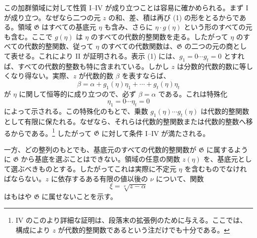 \documentclass[11pt]{article}
\begin{document}
この加群領域に対して性質 I--IV が成り立つことは容易に確かめられる。まず I が成り立つ。なぜなら二つの元 $z$ の和、差、積は再び (1) の形をとるからである。領域 $\mathfrak G$ はすべての基底元 $\eta$ も含み、さらに $\eta\cdot g(\eta)$ という形のすべての元も含む。ここで $g(\eta)$ は $\eta$ のすべての代数的整関数を走る。したがって $\eta$ のすべての代数的整関数、従って $\eta$ のすべての代数関数は、$\mathfrak G$ の二つの元の商として表せる。これにより II が証明される。表示 (1) には、$g_1=0\cdots g_t=0$ とすれば、すべての代数的整数も特に含まれている。しかし $z$ は分数的代数的数に等しくなり得ない。実際、$z$ が代数的数 $\beta$ を表すならば、
\[
 \beta=\alpha+g_1(\eta)\eta_1+\cdots+g_t(\eta)\eta_t
\]
が $\eta$ に関して恒等的に成り立つので、必ず $\beta=\alpha$ である。これは特殊化
\[
 \eta_1=0\cdots \eta_t=0
\]
によって示される。この特殊化のもとで、乗数 $g_1(\eta)\cdots g_t(\eta)$ は代数的整関数として有限に保たれる。なぜなら、それらは代数的整関数または代数的整数へ移るからである。\footnote{IV のこのより詳細な証明は、段落末の拡張例のために与える。ここでは、構成により $z$ が代数的整関数であるという注だけでも十分である。} したがって $\mathfrak G$ に対して条件 I--IV が満たされる。

一方、どの整列のもとでも、基底元のすべての代数的整関数が $\mathfrak G$ に属するように $\mathfrak G$ から基底を選ぶことはできない。領域の任意の関数 $z(\eta)$ を、基底元として選ぶべきものとする。したがってこれは実際に不定元 $\eta$ を含むものでなければならない。$z$ に依存するある有限の値以後の $\nu$ について、関数
\[
 \xi=\sqrt[\nu]{z-\alpha}
\]
はもはや $\mathfrak G$ に属せないことを示す。
\end{document}

